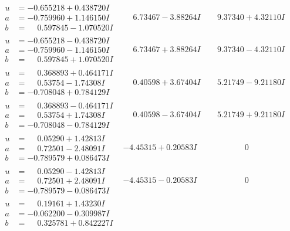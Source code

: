 \documentclass[1p]{elsarticle_modified}
\theoremstyle{definition}
\begin{document}
$$\begin{array}{c|c|c}
\begin{aligned}
u &= -0.655218 + 0.438720 I \\
a &= -0.759960 + 1.146150 I \\
b &= \phantom{-}0.597845 - 1.070520 I\end{aligned}
 & \phantom{-}6.73467 - 3.88264 I & \phantom{-}9.37340 + 4.32110 I \\ \hline\begin{aligned}
u &= -0.655218 - 0.438720 I \\
a &= -0.759960 - 1.146150 I \\
b &= \phantom{-}0.597845 + 1.070520 I\end{aligned}
 & \phantom{-}6.73467 + 3.88264 I & \phantom{-}9.37340 - 4.32110 I \\ \hline\begin{aligned}
u &= \phantom{-}0.368893 + 0.464171 I \\
a &= \phantom{-}0.53754 - 1.74308 I \\
b &= -0.708048 + 0.784129 I\end{aligned}
 & \phantom{-}0.40598 + 3.67404 I & \phantom{-}5.21749 - 9.21180 I \\ \hline\begin{aligned}
u &= \phantom{-}0.368893 - 0.464171 I \\
a &= \phantom{-}0.53754 + 1.74308 I \\
b &= -0.708048 - 0.784129 I\end{aligned}
 & \phantom{-}0.40598 - 3.67404 I & \phantom{-}5.21749 + 9.21180 I \\ \hline\begin{aligned}
u &= \phantom{-}0.05290 + 1.42813 I \\
a &= \phantom{-}0.72501 - 2.48091 I \\
b &= -0.789579 + 0.086473 I\end{aligned}
 & -4.45315 + 0.20583 I & \phantom{-0.000000 } 0 \\ \hline\begin{aligned}
u &= \phantom{-}0.05290 - 1.42813 I \\
a &= \phantom{-}0.72501 + 2.48091 I \\
b &= -0.789579 - 0.086473 I\end{aligned}
 & -4.45315 - 0.20583 I & \phantom{-0.000000 } 0 \\ \hline\begin{aligned}
u &= \phantom{-}0.19161 + 1.43230 I \\
a &= -0.062200 - 0.309987 I \\
b &= \phantom{-}0.325781 + 0.842227 I\end{aligned}

\end{array}$$
\end{document}
